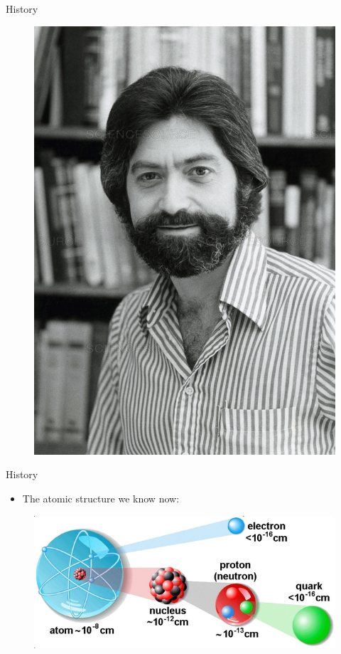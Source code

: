 \documentclass{beamer}
\begin{document}
{\begin{frame}{History}
\begin{figure}
        \includegraphics[scale=0.279]{figures/Zweig.jpg}
    \end{figure}
\end{frame}
}

\begin{frame}{History}
    \begin{itemize}
        \item The atomic structure we know now:
    \end{itemize}
    \begin{figure}
        \includegraphics[scale=0.5]{figures/atom_structure.png}
    \end{figure}
\end{frame}
\end{document}
